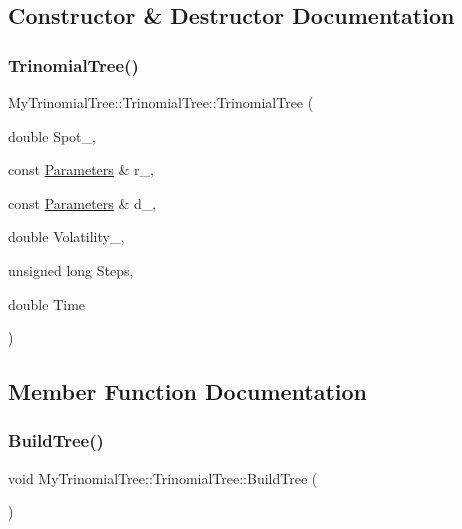 \subsection{Constructor \& Destructor Documentation}
\hypertarget{classMyTrinomialTree_1_1TrinomialTree_ae83aba0816cc8988e8c1842cc41590b2}{}\label{classMyTrinomialTree_1_1TrinomialTree_ae83aba0816cc8988e8c1842cc41590b2} 
\subsubsection{\texorpdfstring{Trinomial\+Tree()}{TrinomialTree()}}
{\footnotesize\ttfamily My\+Trinomial\+Tree\+::\+Trinomial\+Tree\+::\+Trinomial\+Tree (\begin{DoxyParamCaption}\item[{double}]{Spot\+\_\+,  }\item[{const \hyperlink{classParameters}{Parameters} \&}]{r\+\_\+,  }\item[{const \hyperlink{classParameters}{Parameters} \&}]{d\+\_\+,  }\item[{double}]{Volatility\+\_\+,  }\item[{unsigned long}]{Steps,  }\item[{double}]{Time }\end{DoxyParamCaption})}



\subsection{Member Function Documentation}
\hypertarget{classMyTrinomialTree_1_1TrinomialTree_a47dd32274bada6fbd59fe0e048d92b58}{}\label{classMyTrinomialTree_1_1TrinomialTree_a47dd32274bada6fbd59fe0e048d92b58} 
\subsubsection{\texorpdfstring{Build\+Tree()}{BuildTree()}}
{\footnotesize\ttfamily void My\+Trinomial\+Tree\+::\+Trinomial\+Tree\+::\+Build\+Tree (\begin{DoxyParamCaption}{ }\end{DoxyParamCaption})}

